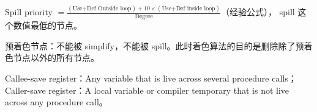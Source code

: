 \par \noindent Spill priority $= \frac{(\text{Use+Def Outside loop}) + 10 \times (\text{Use+Def inside loop})}{\text{Degree}}$（经验公式），
spill 这个数值最低的节点。

\par \noindent 预着色节点：不能被 simplify，不能被 spill。此时着色算法的目的是删除除了预着色节点以外的所有节点。

\par \noindent Callee-save register：Any variable that is live across several procedure calls；
Caller-save register：A local variable or compiler temporary that is not live across any procedure call。
